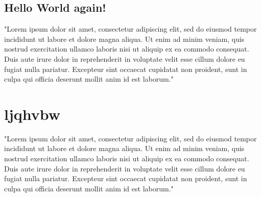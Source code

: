 \documentclass[a4paper,12pt]{article}
\begin{document}
\subsection{Hello World again!}
"Lorem ipsum dolor sit amet, consectetur adipiscing elit, sed do eiusmod tempor incididunt ut labore et dolore magna aliqua. Ut enim ad minim veniam, quis nostrud exercitation ullamco laboris nisi ut aliquip ex ea commodo consequat. Duis aute irure dolor in reprehenderit in voluptate velit esse cillum dolore eu fugiat nulla pariatur. Excepteur sint occaecat cupidatat non proident, sunt in culpa qui officia deserunt mollit anim id est laborum."

\newpage

\section{ljqhvbw}
"Lorem ipsum dolor sit amet, consectetur adipiscing elit, sed do eiusmod tempor incididunt ut labore et dolore magna aliqua. Ut enim ad minim veniam, quis nostrud exercitation ullamco laboris nisi ut aliquip ex ea commodo consequat. Duis aute irure dolor in reprehenderit in voluptate velit esse cillum dolore eu fugiat nulla pariatur. Excepteur sint occaecat cupidatat non proident, sunt in culpa qui officia deserunt mollit anim id est laborum."
\end{document}
